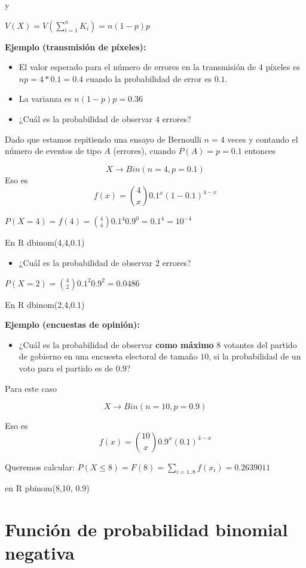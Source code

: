 \documentclass[
]{book}
\providecommand{\tightlist}{%
  \setlength{\itemsep}{0pt}\setlength{\parskip}{0pt}}
\begin{document}
y

\(V(X)=V(\sum_{i=1}^n K_i)=n(1-p)p\)

\textbf{Ejemplo (transmisión de píxeles):}

\begin{itemize}
\item
  El valor esperado para el número de errores en la transmisión de \(4\) píxeles es \(np=4*0.1=0.4\) cuando la probabilidad de error es \(0.1\).
\item
  La varianza es \(n(1-p)p=0.36\)
\item
  ¿Cuál es la probabilidad de observar \(4\) errores?
\end{itemize}

Dado que estamos repitiendo una ensayo de Bernoulli \(n=4\) veces y contando el número de eventos de tipo \(A\) (errores), cuando \(P(A)=p=0.1\) entonces

\[X \rightarrow Bin(n=4, p=0.1)\]
Eso es \[f(x)=\binom 4 x 0.1^x(1-0.1)^{4-x}\]

\(P(X=4)=f(4)=\binom 4 4 0.1^4 0.9^{0}=0.1^4=10^{-4}\)

En R dbinom(4,4,0.1)

\begin{itemize}
\tightlist
\item
  ¿Cuál es la probabilidad de observar \(2\) errores?
\end{itemize}

\(P(X=2)=\binom 4 2 0.1^2 0.9^2=0.0486\)

En R dbinom(2,4,0.1)

\textbf{Ejemplo (encuestas de opinión):}

\begin{itemize}
\tightlist
\item
  ¿Cuál es la probabilidad de observar \textbf{como máximo} \(8\) votantes del partido de gobierno en una encuesta electoral de tamaño \(10\), si la probabilidad de un voto para el partido es de \(0.9\)?
\end{itemize}

Para este caso

\[X \rightarrow Bin(n=10, p=0.9)\]

Eso es \[f(x)=\binom {10} x 0.9^x(0.1)^{4-x}\]

Queremos calcular:
\(P(X\le 8)=F(8)= \sum_{i=1..8} f(x_i)=0.2639011\)

en R pbinom(8,10, 0.9)

\hypertarget{funciuxf3n-de-probabilidad-binomial-negativa}{%
\section{Función de probabilidad binomial negativa}\label{funciuxf3n-de-probabilidad-binomial-negativa}}
\end{document}
